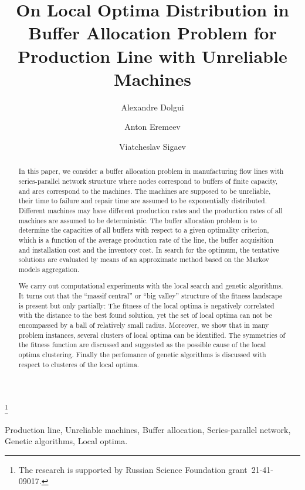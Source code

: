 \documentclass{ifacconf}
\begin{document}
\begin{frontmatter}

\title{On Local Optima Distribution in Buffer Allocation Problem for Production Line with Unreliable Machines} 

\thanks[footnoteinfo]{The research is supported by Russian Science Foundation  grant~21-41-09017.}

\author[First]{Alexandre Dolgui} 
\author[Second]{Anton Eremeev} 
\author[Third]{Viatcheslav Sigaev}

\address[First]{IMT Atlantique, Nantes, France}
\address[Second]{Sobolev Institute of Mathematics SB RAS, Novosibirsk, Russia (e-mail: eremeev@ofim.oscsbras.ru).}
\address[Third]{Avtomatika-Servis LLC, Omsk, Russia (e-mail: sigvs@yandex.ru).}


\begin{abstract}                %
In this paper, we consider a buffer allocation problem in manufacturing flow lines with series-parallel 
network structure where nodes correspond to buffers  of finite capacity, and arcs correspond to the machines. 
The machines are supposed to be unreliable, their time to failure and repair time are
assumed to be exponentially distributed. Different machines may have
different production rates and the production rates of all machines are assumed to be deterministic. 
The buffer allocation problem is to determine the capacities of all buffers with respect to a given
optimality criterion, which is a function of the average production rate
of the line, the buffer acquisition and installation cost and the
inventory cost. In search for the optimum, the tentative solutions are evaluated by means of an
approximate method based on the Markov models aggregation. 

We carry out computational experiments with the local search and genetic algorithms.
It turns out that the ``massif central'' or ``big valley'' structure
of the fitness landscape is present but only partially: The fitness of the local optima is negatively correlated with 
the distance to the best found solution, yet the set of local optima can not be encompassed by a ball of relatively small radius. 
Moreover, we show that in many problem instances, several clusters of local optima can be identified. The symmetries of the fitness
function are discussed and suggested as the possible cause of the local optima clustering. 
Finally the perfomance of genetic algorithms is discussed with respect to clusteres of the local optima.
\end{abstract}

\begin{keyword}
Production line, Unreliable machines, Buffer allocation, Series-parallel network, Genetic algorithms, Local optima.
\end{keyword}

\end{frontmatter}
\end{document}
